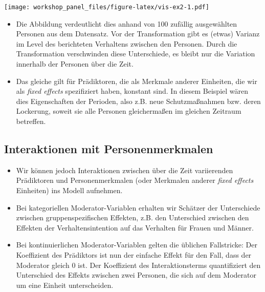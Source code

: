 \documentclass[
]{book}
\newenvironment{Shaded}{\begin{snugshade}}{\end{snugshade}}
\newcommand{\DataTypeTok}[1]{\textcolor[rgb]{0.13,0.29,0.53}{#1}}
\newcommand{\KeywordTok}[1]{\textcolor[rgb]{0.13,0.29,0.53}{\textbf{#1}}}
\newcommand{\NormalTok}[1]{#1}
\newcommand{\OperatorTok}[1]{\textcolor[rgb]{0.81,0.36,0.00}{\textbf{#1}}}
\newcommand{\StringTok}[1]{\textcolor[rgb]{0.31,0.60,0.02}{#1}}
\providecommand{\tightlist}{%
  \setlength{\itemsep}{0pt}\setlength{\parskip}{0pt}}
\begin{document}
\texttt{[image: workshop\_panel\_files/figure-latex/vis-ex2-1.pdf]}

\begin{itemize}
\item
  Die Abbildung verdeutlicht dies anhand von 100 zufällig ausgewählten Personen aus dem Datensatz. Vor der Transformation gibt es (etwas) Varianz im Level des berichteten Verhaltens zwischen den Personen. Durch die Transformation verschwinden diese Unterschiede, es bleibt nur die Variation innerhalb der Personen über die Zeit.
\item
  Das gleiche gilt für Prädiktoren, die als Merkmale anderer Einheiten, die wir als \emph{fixed effects} spezifiziert haben, konstant sind. In diesem Beispiel wären dies Eigenschaften der Perioden, also z.B. neue Schutzmaßnahmen bzw. deren Lockerung, soweit sie alle Personen gleichermaßen im gleichen Zeitraum betreffen.
\end{itemize}

\hypertarget{interaktionen-mit-personenmerkmalen}{%
\subsection*{Interaktionen mit Personenmerkmalen}\label{interaktionen-mit-personenmerkmalen}}

\begin{itemize}
\tightlist
\item
  Wir können jedoch Interaktionen zwischen über die Zeit variierenden Prädiktoren und Personenmerkmalen (oder Merkmalen anderer \emph{fixed effects} Einheiten) ins Modell aufnehmen.
\item
  Bei kategoriellen Moderator-Variablen erhalten wir Schätzer der Unterschiede zwischen gruppenspezifischen Effekten, z.B. den Unterschied zwischen den Effekten der Verhaltensintention auf das Verhalten für Frauen und Männer.
\item
  Bei kontinuierlichen Moderator-Variablen gelten die üblichen Fallstricke: Der Koeffizient des Prädiktors ist nun der einfache Effekt für den Fall, dass der Moderator gleich 0 ist. Der Koeffizient des Interaktionsterms quantifiziert den Unterschied des Effekts zwischen zwei Personen, die sich auf dem Moderator um eine Einheit unterscheiden.
\end{itemize}

\begin{Shaded}
\end{Shaded}
\end{document}

